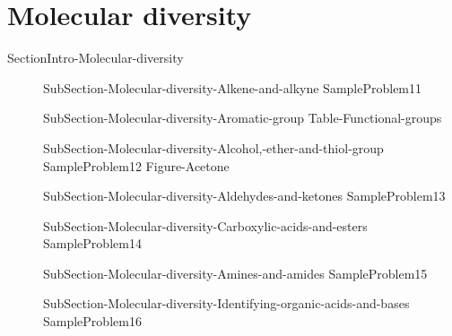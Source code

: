 \documentclass[main.tex]{subfiles}
\newcommand\chapterlabel{Ch-orgo}\setcounter{figurenewcounter}{0}\setcounter{tablenewcounter}{0}\setcounter{formulanewcounter}{0}
\begin{document}
\section{Molecular diversity}{SectionIntro-Molecular-diversity}
\sloppy\begin{description}
\item[]{SubSection-Molecular-diversity-Alkene-and-alkyne}
{SampleProblem11}
 \item[]{SubSection-Molecular-diversity-Aromatic-group}
 {Table-Functional-groups}
\item[]{SubSection-Molecular-diversity-Alcohol,-ether-and-thiol-group}
{SampleProblem12}
\newpage\hspace{0cm}  {Figure-Acetone}
\item[] {SubSection-Molecular-diversity-Aldehydes-and-ketones}
{SampleProblem13}
\item[]{SubSection-Molecular-diversity-Carboxylic-acids-and-esters}
{SampleProblem14}
 \item[] {SubSection-Molecular-diversity-Amines-and-amides}
  {SampleProblem15}
\item[]{SubSection-Molecular-diversity-Identifying-organic-acids-and-bases}
{SampleProblem16}
 \end{description}
 
 
 
\end{document}
